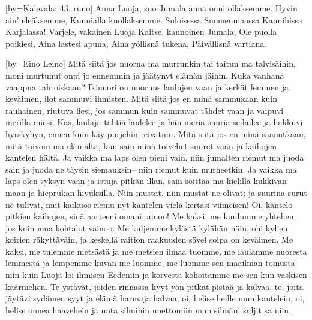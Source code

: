 [by={Kalevala: 43. runo}]
  \beginverse
    Anna Luoja, suo Jumala
    anna onni ollaksemme.
    Hyvin ain’ eleäksemme,
    Kunnialla kuollaksemme.
    Suloisessa Suomenmaassa
    Kaunihissa Karjalassa!
  \endverse
  \beginverse
    Varjele, vakainen Luoja
    Kaitse, kaunoinen Jumala,
    Ole puolla poikiesi,
    Aina lastesi apuna,
    Aina yöllisnä tukena,
    Päivällisnä vartiana.
  \endverse
\endsong


\sclearpage
{}[by={Eino Leino}]
  \beginverse
    Mitä siitä jos nuorna ma murrunkin
    tai taitun ma talvisäihin,
    moni murtunut onpi jo ennemmin
    ja jäätynyt elämän jäihin.
    Kuka vanhana vaappua tahtoiskaan?
    Ikinuori on nuoruus laulujen vaan
    ja kerkät lemmen ja keväimen,
    ilot sammuvi ihmisten.
  \endverse
  \beginverse
    Mitä siitä jos en minä sammukaan
    kuin rauhainen, riutuva liesi,
    jos sammun kuin sammuvat tähdet vaan
    ja vaipuvi merillä miesi.
    Kas, laulaja tähtiä laulelee
    ja hän meriä suuria seilailee
    ja hukkuvi hyrskyhyn, ennen kuin
    käy purjehin reivatuin.
  \endverse
  \beginverse
    Mitä siitä jos en minä saanutkaan,
    mitä toivoin ma elämältä,
    kun sain minä toivehet suuret vaan
    ja kaihojen kantelen hältä.
    Ja vaikka ma laps olen pieni vain,
    niin jumalten riemut ma juoda sain
    ja juoda ne täysin siemauksin--
    niin riemut kuin murheetkin.
  \endverse
  \beginverse
    Ja vaikka ma laps olen syksyn vaan
    ja istuja pitkän illan,
    sain soittaa ma kielillä kukkivan maan
    ja hieprukan hivuksilla.
    Niin mustat, niin mustat ne olivat;
    ja suurina surut ne tulivat,
    mut kaikuos riemu nyt kantelen
    vielä kertasi viimeisen!
  \endverse
  \beginverse
    Oi, kantelo pitkien kaihojen,
    sinä aarteeni omani, ainoo!
    Me kaksi, me kuulumme yhtehen,
    jos kuin mua kohtalot vainoo.
    Me kuljemme kylästä kylähän näin,
    ohi kylien koirien räkyttäväin,
    ja keskellä raition raakuuden
    sävel soipa on keväimen.
  \endverse
  \beginverse
    Me kaksi, me tulemme metsästä
    ja me metsien ilmaa tuomme,
    me laulamme nuoresta lemmestä
    ja lempemme kuvan me luomme,
    me luomme sen maailman tomusta niin
    kuin Luoja loi ihmisen Eedeniin
    ja korvesta kohoitamme me sen
    kun vaskisen käärmehen.
  \endverse
  \beginverse
    Te ystävät, joiden rinnassa kyyt
    yön-pitkät pistää ja kalvaa,
    te, joita jäytävi sydämen syyt
    ja elämä harmaja halvaa,
    oi, helise heille mun kantelein,
    oi, helise onnea haavehein
    ja unta silmihin unettomiin
    mun silmäni suljit sa niin.
